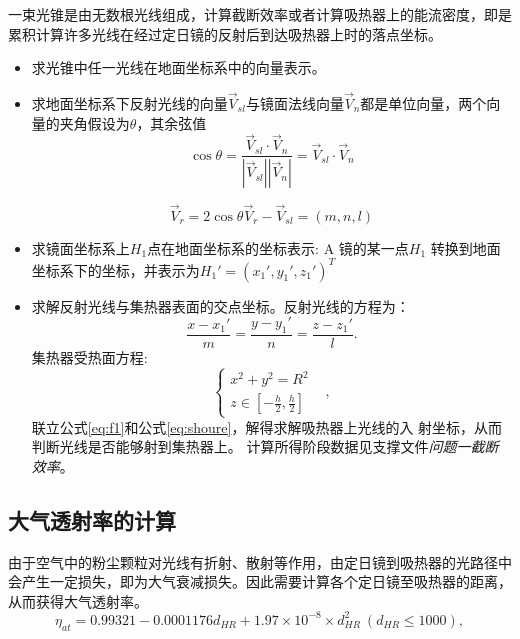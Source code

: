 \documentclass[withoutpreface,bwprint]{cumcmthesis}
\begin{document}
	一束光锥是由无数根光线组成，计算截断效率或者计算吸热器上的能流密度，即是累积计算许多光线在经过定日镜的反射后到达吸热器上时的落点坐标。
	\begin{itemize}
		\item [(1)] 
		求光锥中任一光线在地面坐标系中的向量表示。
		\item [(2)]
		求地面坐标系下反射光线的向量$\vec{V}_{sl}$与镜面法线向量$\vec{V}_n$都是单位向量，两个向量的夹角假设为$\theta$，其余弦值
		\begin{equation}
		\cos \theta=\frac{\vec{V}_{sl}·\vec{V}_n}{\left | \vec{V}_{sl} \right | \left | \vec{V}_n \right | } =\vec{V}_{sl} · \vec{V}_n 
		\end{equation}
		
		\begin{equation}
		\vec{V}_{r}=2\cos\theta\vec{V}_{r}-\vec{V}_{sl}=(m,n,l)
		\end{equation}
		
		\item [(3)]
		求镜面坐标系上$ H_1 $点在地面坐标系的坐标表示: A 镜的某一点$ H_1$ 转换到地面坐标系下的坐标，并表示为${H_1}'={({x_1}',{y_1}',{z_1}')}^T$
		\item [(4)]
		求解反射光线与集热器表面的交点坐标。反射光线的方程为：
		\begin{equation}
		\frac{x-{x_1}'}{m}=\frac{y-{y_1}'}{n}=\frac{z-{z_1}'}{l}.
		\label{eq:f1}
		\end{equation}
		集热器受热面方程:
		\begin{equation}
		\begin{cases}
		x^2+y^2=R^2\\
		z\in [-\frac{h}{2} ,\frac{h}{2}] &
		\end{cases}
		\label{eq:shoure},
		\end{equation}
		联立公式\cref{eq:f1}和公式\cref{eq:shoure}，解得求解吸热器上光线的入
		射坐标，从而判断光线是否能够射到集热器上。
		计算所得阶段数据见支撑文件\textit{问题一截断效率}。
	\end{itemize}   
		
		\subsection{大气透射率的计算}
		由于空气中的粉尘颗粒对光线有折射、散射等作用，由定日镜到吸热器的光路径中会产生一定损失，即为大气衰减损失。因此需要计算各个定日镜至吸热器的距离，从而获得大气透射率。		
		\begin{equation}
		\eta _{at}=0.99321-0.0001176d_{HR}+1.97\times 10^{-8}\times d_{HR}^{2} \ (d_{HR}\le 1000),
		\end{equation}
		
\end{document}
